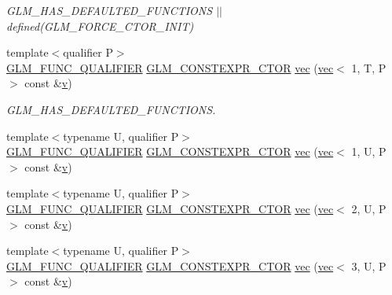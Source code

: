 \begin{DoxyCompactItemize}
\begin{DoxyCompactList}\small\item\em G\+L\+M\+\_\+\+H\+A\+S\+\_\+\+D\+E\+F\+A\+U\+L\+T\+E\+D\+\_\+\+F\+U\+N\+C\+T\+I\+O\+NS $\vert$$\vert$ defined(\+G\+L\+M\+\_\+\+F\+O\+R\+C\+E\+\_\+\+C\+T\+O\+R\+\_\+\+I\+N\+I\+T) \end{DoxyCompactList}\item 
{\footnotesize template$<$qualifier P$>$ }\\\mbox{\hyperlink{setup_8hpp_a33fdea6f91c5f834105f7415e2a64407}{G\+L\+M\+\_\+\+F\+U\+N\+C\+\_\+\+Q\+U\+A\+L\+I\+F\+I\+ER}} \mbox{\hyperlink{setup_8hpp_ad34178a09666081abdb573c14d1f4a5a}{G\+L\+M\+\_\+\+C\+O\+N\+S\+T\+E\+X\+P\+R\+\_\+\+C\+T\+OR}} \mbox{\hyperlink{structglm_1_1vec_3_011_00_01_t_00_01_q_01_4_a65d7b47aa379986d75f0e64f7141f5d0}{vec}} (\mbox{\hyperlink{structglm_1_1vec}{vec}}$<$ 1, T, P $>$ const \&\mbox{\hyperlink{_s_d_l__opengl_8h_a10a82eabcb59d2fcd74acee063775f90}{v}})
\begin{DoxyCompactList}\small\item\em G\+L\+M\+\_\+\+H\+A\+S\+\_\+\+D\+E\+F\+A\+U\+L\+T\+E\+D\+\_\+\+F\+U\+N\+C\+T\+I\+O\+NS. \end{DoxyCompactList}\item 
{\footnotesize template$<$typename U, qualifier P$>$ }\\\mbox{\hyperlink{setup_8hpp_a33fdea6f91c5f834105f7415e2a64407}{G\+L\+M\+\_\+\+F\+U\+N\+C\+\_\+\+Q\+U\+A\+L\+I\+F\+I\+ER}} \mbox{\hyperlink{setup_8hpp_ad34178a09666081abdb573c14d1f4a5a}{G\+L\+M\+\_\+\+C\+O\+N\+S\+T\+E\+X\+P\+R\+\_\+\+C\+T\+OR}} \mbox{\hyperlink{structglm_1_1vec_3_011_00_01_t_00_01_q_01_4_ab8d935770c08c100f574755cf3ab3206}{vec}} (\mbox{\hyperlink{structglm_1_1vec}{vec}}$<$ 1, U, P $>$ const \&\mbox{\hyperlink{_s_d_l__opengl_8h_a10a82eabcb59d2fcd74acee063775f90}{v}})
\item 
{\footnotesize template$<$typename U, qualifier P$>$ }\\\mbox{\hyperlink{setup_8hpp_a33fdea6f91c5f834105f7415e2a64407}{G\+L\+M\+\_\+\+F\+U\+N\+C\+\_\+\+Q\+U\+A\+L\+I\+F\+I\+ER}} \mbox{\hyperlink{setup_8hpp_ad34178a09666081abdb573c14d1f4a5a}{G\+L\+M\+\_\+\+C\+O\+N\+S\+T\+E\+X\+P\+R\+\_\+\+C\+T\+OR}} \mbox{\hyperlink{structglm_1_1vec_3_011_00_01_t_00_01_q_01_4_ab8eadeb013caada0e6a27cfa842ca8da}{vec}} (\mbox{\hyperlink{structglm_1_1vec}{vec}}$<$ 2, U, P $>$ const \&\mbox{\hyperlink{_s_d_l__opengl_8h_a10a82eabcb59d2fcd74acee063775f90}{v}})
\item 
{\footnotesize template$<$typename U, qualifier P$>$ }\\\mbox{\hyperlink{setup_8hpp_a33fdea6f91c5f834105f7415e2a64407}{G\+L\+M\+\_\+\+F\+U\+N\+C\+\_\+\+Q\+U\+A\+L\+I\+F\+I\+ER}} \mbox{\hyperlink{setup_8hpp_ad34178a09666081abdb573c14d1f4a5a}{G\+L\+M\+\_\+\+C\+O\+N\+S\+T\+E\+X\+P\+R\+\_\+\+C\+T\+OR}} \mbox{\hyperlink{structglm_1_1vec_3_011_00_01_t_00_01_q_01_4_adb99870d209d6225f67a5d12e8f04df5}{vec}} (\mbox{\hyperlink{structglm_1_1vec}{vec}}$<$ 3, U, P $>$ const \&\mbox{\hyperlink{_s_d_l__opengl_8h_a10a82eabcb59d2fcd74acee063775f90}{v}})

\end{DoxyCompactItemize}
